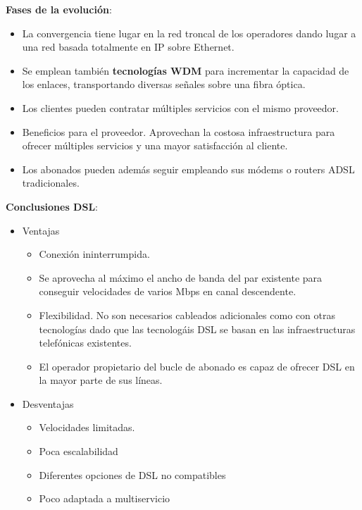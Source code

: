 \documentclass[10pt,portrait, twocolumn]{article}
\begin{document}
\textbf{Fases de la evolución}:	
	
	\begin{itemize}
	\item La convergencia tiene lugar en la red troncal de los operadores dando lugar a una red basada totalmente en IP sobre Ethernet.
	\item  Se emplean también \textbf{tecnologías WDM} para incrementar la capacidad de los enlaces, transportando diversas señales sobre una fibra óptica.
	\item  Los clientes pueden contratar múltiples servicios con el mismo proveedor.
	\item Beneficios para el proveedor. Aprovechan la costosa infraestructura para ofrecer múltiples servicios y una mayor satisfacción al cliente.
	\item Los abonados pueden además seguir empleando sus módems o routers ADSL tradicionales.
	\end{itemize}

\textbf{Conclusiones DSL}:

	\begin{itemize}
	\item Ventajas
	
		\begin{itemize}
		\item Conexión ininterrumpida.
		\item Se aprovecha al máximo el ancho de banda del par existente para conseguir velocidades de varios Mbps en canal descendente. 
		\item Flexibilidad. No son necesarios cableados adicionales como con otras tecnologías dado que las tecnologáis DSL se basan en las infraestructuras telefónicas existentes.
		\item El operador propietario del bucle de abonado es capaz de ofrecer DSL en la mayor parte de sus líneas.
		\end{itemize}
	
	\item Desventajas
	
		\begin{itemize}
		\item Velocidades limitadas.
		\item Poca escalabilidad
		\item Diferentes opciones de DSL no compatibles
		\item Poco adaptada a multiservicio
		\end{itemize}
	
	\end{itemize}
\end{document}
